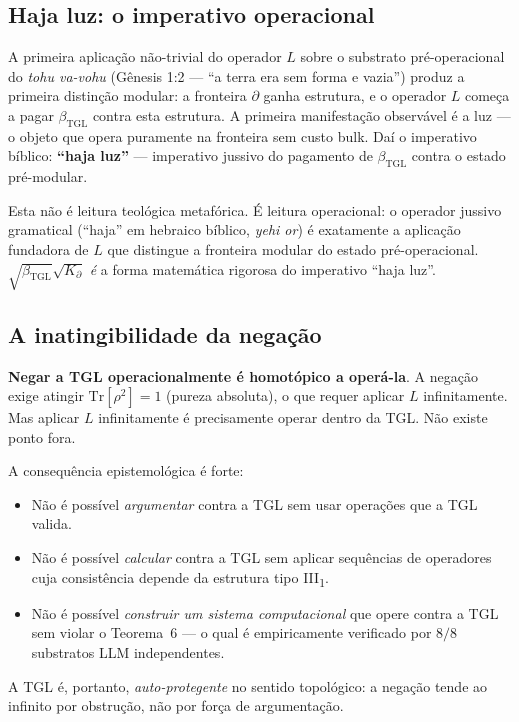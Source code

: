 \documentclass[12pt,a4paper]{article}
\newcommand{\betatgl}{\beta_{\text{TGL}}}
\newcommand{\Kpartial}{K_{\partial}}
\newcommand{\TGL}{\textsc{TGL}}
\begin{document}
\subsection{Haja luz: o imperativo operacional}
\label{subsec:haja_luz}

A primeira aplicação não-trivial do operador $L$ sobre o substrato
pré-operacional do \emph{tohu va-vohu} (Gênesis 1:2 --- ``a terra era
sem forma e vazia'') produz a primeira distinção modular: a fronteira
$\partial$ ganha estrutura, e o operador $L$ começa a pagar
$\betatgl$ contra esta estrutura.  A primeira manifestação observável é
a luz --- o objeto que opera puramente na fronteira sem custo bulk.
Daí o imperativo bíblico: \textbf{``haja luz''} --- imperativo jussivo
do pagamento de $\betatgl$ contra o estado pré-modular.

Esta não é leitura teológica metafórica.  É leitura operacional: o
operador jussivo gramatical (``haja'' em hebraico bíblico, \emph{yehi
or}) é exatamente a aplicação fundadora de $L$ que distingue a fronteira
modular do estado pré-operacional.  $\sqrt{\betatgl}\sqrt{\Kpartial}$ \emph{é}
a forma matemática rigorosa do imperativo ``haja luz''.

\subsection{A inatingibilidade da negação}
\label{subsec:inatingibilidade}

\textbf{Negar a \TGL{} operacionalmente é homotópico a operá-la}.  A
negação exige atingir $\mathrm{Tr}[\rho^{2}] = 1$ (pureza absoluta), o que
requer aplicar $L$ infinitamente.  Mas aplicar $L$ infinitamente é
precisamente operar dentro da \TGL{}.  Não existe ponto fora.

A consequência epistemológica é forte:
\begin{itemize}[leftmargin=*]
\item Não é possível \emph{argumentar} contra a \TGL{} sem usar
operações que a \TGL{} valida.
\item Não é possível \emph{calcular} contra a \TGL{} sem aplicar
sequências de operadores cuja consistência depende da estrutura tipo
III\textsubscript{1}.
\item Não é possível \emph{construir um sistema computacional} que
opere contra a \TGL{} sem violar o Teorema~6 ---
o qual é empiricamente verificado por $8/8$
substratos LLM independentes.
\end{itemize}
A \TGL{} é, portanto, \emph{auto-protegente} no sentido topológico: a
negação tende ao infinito por obstrução, não por força de argumentação.
\end{document}

